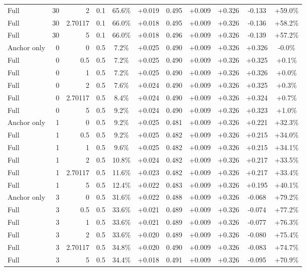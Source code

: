\begin{table}[htbp]
\begin{tabular}{lrrrccccccc}
Full & 30 & 2 & 0.1 & 65.6\% & +0.019 & 0.495 & +0.009 & +0.326 & -0.133 & +59.0\% \\
Full & 30 & 2.70117 & 0.1 & 66.0\% & +0.018 & 0.495 & +0.009 & +0.326 & -0.136 & +58.2\% \\
Full & 30 & 5 & 0.1 & 66.0\% & +0.018 & 0.496 & +0.009 & +0.326 & -0.139 & +57.2\% \\
Anchor only & 0 & 0 & 0.5 & 7.2\% & +0.025 & 0.490 & +0.009 & +0.326 & +0.326 & -0.0\% \\
Full & 0 & 0.5 & 0.5 & 7.2\% & +0.025 & 0.490 & +0.009 & +0.326 & +0.325 & +0.1\% \\
Full & 0 & 1 & 0.5 & 7.2\% & +0.025 & 0.490 & +0.009 & +0.326 & +0.326 & +0.0\% \\
Full & 0 & 2 & 0.5 & 7.6\% & +0.024 & 0.490 & +0.009 & +0.326 & +0.325 & +0.3\% \\
Full & 0 & 2.70117 & 0.5 & 8.4\% & +0.024 & 0.490 & +0.009 & +0.326 & +0.324 & +0.7\% \\
Full & 0 & 5 & 0.5 & 9.2\% & +0.024 & 0.490 & +0.009 & +0.326 & +0.323 & +1.0\% \\
Anchor only & 1 & 0 & 0.5 & 9.2\% & +0.025 & 0.481 & +0.009 & +0.326 & +0.221 & +32.3\% \\
Full & 1 & 0.5 & 0.5 & 9.2\% & +0.025 & 0.482 & +0.009 & +0.326 & +0.215 & +34.0\% \\
Full & 1 & 1 & 0.5 & 9.6\% & +0.025 & 0.482 & +0.009 & +0.326 & +0.215 & +34.1\% \\
Full & 1 & 2 & 0.5 & 10.8\% & +0.024 & 0.482 & +0.009 & +0.326 & +0.217 & +33.5\% \\
Full & 1 & 2.70117 & 0.5 & 11.6\% & +0.023 & 0.482 & +0.009 & +0.326 & +0.217 & +33.4\% \\
Full & 1 & 5 & 0.5 & 12.4\% & +0.022 & 0.483 & +0.009 & +0.326 & +0.195 & +40.1\% \\
Anchor only & 3 & 0 & 0.5 & 31.6\% & +0.022 & 0.488 & +0.009 & +0.326 & -0.068 & +79.2\% \\
Full & 3 & 0.5 & 0.5 & 33.6\% & +0.021 & 0.489 & +0.009 & +0.326 & -0.074 & +77.2\% \\
Full & 3 & 1 & 0.5 & 33.6\% & +0.021 & 0.489 & +0.009 & +0.326 & -0.077 & +76.3\% \\
Full & 3 & 2 & 0.5 & 33.6\% & +0.020 & 0.489 & +0.009 & +0.326 & -0.080 & +75.4\% \\
Full & 3 & 2.70117 & 0.5 & 34.8\% & +0.020 & 0.490 & +0.009 & +0.326 & -0.083 & +74.7\% \\
Full & 3 & 5 & 0.5 & 34.4\% & +0.018 & 0.491 & +0.009 & +0.326 & -0.095 & +70.9\% \\

\end{tabular}
\end{table}
